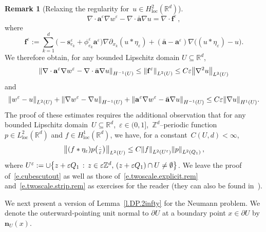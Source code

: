 \documentclass[11pt]{article} %
\numberwithin{equation}{section}
\theoremstyle{definition}
\newtheorem{remark}[theorem]{Remark}
\let\originalleft\left
\let\originalright\right
\renewcommand{\left}{\mathopen{}\mathclose\bgroup\originalleft}
\renewcommand{\right}{\aftergroup\egroup\originalright}
\newcommand*{\Zd}{\ensuremath{\mathbb{Z}^d}}
\newcommand*{\Rd}{\ensuremath{\mathbb{R}^d}}
\newcommand{\eps}{\varepsilon}
\newcommand{\f}{\mathbf{f}}
\newcommand{\s}{\mathbf{s}}
\newcommand{\ep}{\eps}
\renewcommand{\a}{\mathbf{a}}
\newcommand{\ahom}{\bar{\a}}
\begin{document}
\begin{remark}[{Relaxing the regularity for~$u\in H^2_{\mathrm{loc}}(\Rd)$}]
\begin{equation}
\label{e.twoscale.error.H2}
\nabla \cdot \a^\ep \nabla w^\ep 
-
\nabla\cdot \ahom \nabla u
= 
\nabla\cdot \f^\ep
\,,
\end{equation}
where 
\begin{equation}
\label{e.def.fep.H2}
\f^\ep
:=
\sum_{k=1}^d 
\bigl(
- \s_{e_k}^\ep 
+
\phi_{e_k}^\ep \a^\ep 
\bigr) 
\nabla \partial_{x_k} (u\ast\eta_\ep)
+
(\ahom-\a^\ep) \nabla \bigl( (u\ast\eta_\ep) -u \bigr).
\end{equation}
We therefore obtain, for any bounded Lipschitz domain $U\subseteq \Rd$,  
\begin{equation}
\label{e.twoscale.explicit.rem}
\left\|
\nabla \cdot \a^\ep \nabla w^\ep 
-
\nabla\cdot \ahom \nabla u
\right\|_{H^{-1}(U)} 
\leq 
\left\| \f^\ep \right\|_{L^2(U)}
\leq
C \ep \left\| \nabla^2 u \right\|_{L^2(U)}
\end{equation}
and
\begin{equation}
\label{e.twoscale.strip.rem}
\left\| 
w^\ep - u 
\right\|_{L^2(U)} 
+
\left\| 
\nabla w^\ep - \nabla u \right\|_{H^{-1}(U)} 
+
\left\| 
\a^\ep \nabla w^\ep - \ahom \nabla u \right\|_{H^{-1}(U)}
\leq 
C \ep \left\| \nabla u \right\|_{H^1(U)}.
\end{equation}
The proof of these estimates requires the additional observation that for any bounded Lipschitz domain~$U\subseteq\Rd$,~$\ep\in(0,1]$,~$\Zd$--periodic function~$p \in L^2_{\mathrm{loc}}(\Rd)$ and $f\in H^1_{\mathrm{loc}}(\Rd)$, we have, for a constant~$C(U,d)<\infty$,
\begin{align}
\label{e.cubescutout}
\left\| (f\ast \eta_\ep) p\bigl(\tfrac\cdot\ep\bigr)\right\|_{L^2(U)}
\leq
C \left\| f \right\|_{L^2(U^\ep)}
\left\| p \right\|_{L^2(Q_1)}\,,
\end{align}
where $U^\ep := \cup \left\{ z+\ep Q_1 \, :\, z\in \ep\Zd, \, (z+\ep Q_1) \cap U \neq \emptyset \right\}$.  
We leave the proof of~\eqref{e.cubescutout} as well as those of~\eqref{e.twoscale.explicit.rem} and~\eqref{e.twoscale.strip.rem} as exercises for the reader (they can also be found in~\cite[Chapter 6]{AKMBook}). 
\end{remark}


We next present a version of Lemma~\ref{l.DP.2infty} for the Neumann problem. 
We denote the outerward-pointing unit normal to $\partial U$ at a boundary point $x\in\partial U$ by $\mathbf{n}_{U}(x)$. 
\end{document}
